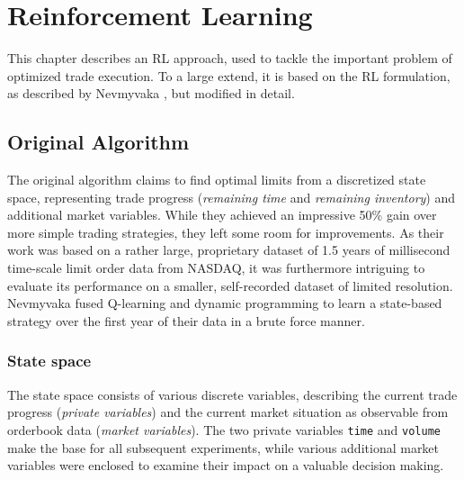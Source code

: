 \chapter{Reinforcement Learning}
\label{chap:reinforcementlearning}
This chapter describes an \ac{RL} approach, used to tackle the important problem of optimized trade execution. To a large extend, it is based on the \ac{RL} formulation, as described by Nevmyvaka \etal \cite{Nevmyvaka:2006}, but modified in detail.\\

\section{Original Algorithm}
The original algorithm claims to find optimal limits from a discretized state space, representing trade progress (\ie \emph{remaining time} and \emph{remaining inventory}) and additional market variables. While they achieved an impressive 50\% gain over more simple trading strategies, they left some room for improvements. As their work was based on a rather large, proprietary dataset of 1.5 years of millisecond time-scale limit order data from NASDAQ, it was furthermore intriguing to evaluate its performance on a smaller, self-recorded dataset of limited resolution.\\

Nevmyvaka \etal \cite{Nevmyvaka:2006} fused Q-learning and dynamic programming to learn a state-based strategy over the first year of their data in a brute force manner.

\subsection{State space}
\label{chap:statespace}
The state space consists of various discrete variables, describing the current trade progress (\emph{private variables}) and the current market situation as observable from orderbook data (\emph{market variables}). The two private variables \lstinline!time! and \lstinline!volume! make the base for all subsequent experiments, while various additional market variables were enclosed to examine their impact on a valuable decision making.\\


